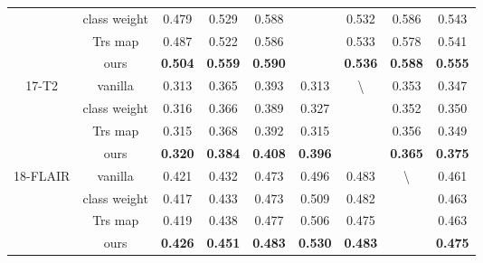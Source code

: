 \begin{table}
{\begin{tabular}{c|ccccccc|c}
 & class weight & 0.479 & 0.529 & 0.588 &  & 0.532 & 0.586 & 0.543\\
 & Trs map & 0.487 & 0.522 & 0.586 &  & 0.533 & 0.578 & 0.541\\
 & ours & {\bf 0.504} & {\bf 0.559} & {\bf 0.590} &  & {\bf 0.536} & {\bf 0.588} & {\bf 0.555}\\
\cmidrule{1-9}
\multirow{4}{*}{17-T2} & vanilla & 0.313 & 0.365 & 0.393 & 0.313 & \multirow{4}{*}{\textbackslash} & 0.353 & 0.347\\
 & class weight & 0.316 & 0.366 & 0.389 & 0.327 &  & 0.352 & 0.350\\
 & Trs map & 0.315 & 0.368 & 0.392 & 0.315 &  & 0.356 & 0.349\\
 & ours & {\bf 0.320} & {\bf 0.384} & {\bf 0.408} & {\bf 0.396} &  & {\bf 0.365} & {\bf 0.375}\\
\cmidrule{1-9}
\multirow{4}{*}{18-FLAIR} & vanilla & 0.421 & 0.432 & 0.473 & 0.496 & 0.483 & \multirow{4}{*}{\textbackslash} & 0.461\\
 & class weight & 0.417 & 0.433 & 0.473 & 0.509 & 0.482 &  & 0.463\\
 & Trs map & 0.419 & 0.438 & 0.477 & 0.506 & 0.475 &  & 0.463\\
 & ours & {\bf 0.426} & {\bf 0.451} & {\bf 0.483} & {\bf 0.530} & {\bf 0.483} &  & {\bf 0.475}\\
\bottomrule
\end{tabular}
}
\end{table}